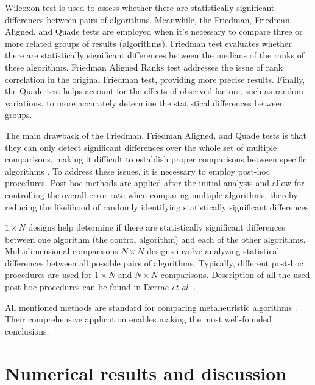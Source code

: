 \documentclass[a4paper,fleqn]{cas-sc}
\begin{document}
Wilcoxon test is used to assess whether there are statistically significant differences between pairs of algorithms.
Meanwhile, the Friedman, Friedman Aligned, and Quade tests are employed when it's necessary to compare three or more related groups of results (algorithms).
Friedman test evaluates whether there are statistically significant differences between the medians of the ranks of these algorithms.
Friedman Aligned Ranks test addresses the issue of rank correlation in the original Friedman test, providing more precise results.
Finally, the Quade test helps account for the effects of observed factors, such as random variations,
to more accurately determine the statistical differences between groups.

The main drawback of the Friedman, Friedman Aligned, and Quade tests is that
they can only detect significant differences over the whole set of multiple comparisons,
making it difficult to establish proper comparisons between specific algorithms \cite{Derrac2011}.
To address these issues, it is necessary to employ post-hoc procedures.
Post-hoc methods are applied after the initial analysis and allow for controlling the overall error rate
when comparing multiple algorithms, thereby reducing the likelihood of randomly identifying statistically significant differences.

$1\times N$ designs help determine if there are statistically significant differences between one algorithm
(the control algorithm) and each of the other algorithms.
Multidimensional comparisons $N\times N$ designs involve analyzing statistical differences between all possible pairs of algorithms.
Typically, different post-hoc procedures are used for $1\times N$ and $N\times N$ comparisons.
Description of all the used post-hoc procedures can be found in Derrac \emph{et al.} \cite{Derrac2011}.

All mentioned methods are standard for comparing metaheuristic algorithms \cite{Derrac2011}.
Their comprehensive application enables making the most well-founded conclusions.




\section{Numerical results and discussion}\label{Result}
\end{document}
